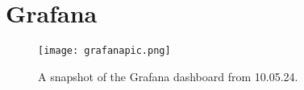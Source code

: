 \section{Grafana}
\label{appendix:grafana}
\begin{figure}[H]
    \begin{center}
        \texttt{[image: grafanapic.png]}
    \end{center}
    \caption{A snapshot of the Grafana dashboard from 10.05.24.}
    \label{fig:grafana-dashboard}
\end{figure}
